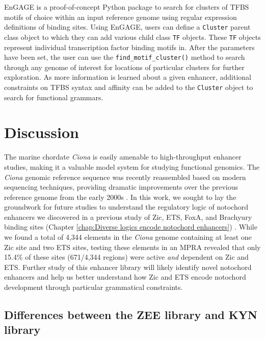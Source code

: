 EnGAGE is a proof-of-concept Python package to search for clusters of TFBS motifs of choice within an input reference genome using regular expression definitions of binding sites. Using EnGAGE, users can define a \verb|Cluster| parent class object to which they can add various child class \verb|TF| objects. These \verb|TF| objects represent individual transcription factor binding motifs in. After the parameters have been set, the user can use the \verb|find_motif_cluster()| method to search through any genome of interest for locations of particular clusters for further exploration. As more information is learned about a given enhancer, additional constraints on TFBS syntax and affinity can be added to the \verb|Cluster| object to search for functional grammars.

\section{Discussion}

The marine chordate \textit{Ciona} is easily amenable to high-throughput enhancer studies, making it a valuable model system for studying functional genomics. The \textit{Ciona} genomic reference sequence was recently reassembled based on modern sequencing techniques, providing dramatic improvements over the previous reference genome from the early 2000s \cite{satou2019,dehal2002}. In this work, we sought to lay the groundwork for future studies to understand the regulatory logic of notochord enhancers we discovered in a previous study of Zic, ETS, FoxA, and Brachyury binding sites (Chapter \ref{chap:Diverse logics encode notochord enhancers}) \cite{song2022}. While we found a total of 4,344 elements in the \textit{Ciona} genome containing at least one Zic site and two ETS sites, testing these elements in an MPRA revealed that only 15.4\% of these sites (671/4,344 regions) were active \textit{and} dependent on Zic and ETS. Further study of this enhancer library will likely identify novel notochord enhancers and help us better understand how Zic and ETS encode notochord development through particular grammatical constraints. 

\subsection{Differences between the ZEE library and KYN library}

